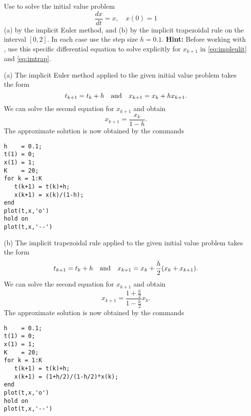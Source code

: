 \documentclass{ximera}
\begin{document}
\begin{exercise} \label{c15.1.7}
Use \Matlab to solve the initial value problem
\[
\frac{dx}{dt} = x,\quad x(0)=1
\]
(a) by the implicit Euler method, and (b) by the implicit trapezoidal 
rule on the interval $[0,2]$.  In each case use the step size $h=0.1$.
{\bf Hint:} Before working with \Matlabp, use this specific differential
equation to solve explicitly for $x_{k+1}$ in \eqref{eq:impleulit} and 
\eqref{eq:imtrap}.

\begin{solution}

(a) The implicit Euler method applied to the given initial
value problem takes the form
\[
t_{k+1} = t_k + h\quad\mbox{and}\quad x_{k+1} = x_k + h x_{k+1}.
\]
We can solve the second equation  for $x_{k+1}$ and obtain
\[
x_{k+1} = \frac{x_k}{1-h}.
\]
The approximate solution is now obtained by the \Matlab commands
\begin{verbatim}
h    = 0.1;
t(1) = 0;
x(1) = 1;
K    = 20;
for k = 1:K
   t(k+1) = t(k)+h;
   x(k+1) = x(k)/(1-h);
end
plot(t,x,'o')
hold on
plot(t,x,'--')
\end{verbatim}

(b) The implicit trapezoidal rule applied to the given initial
value problem takes the form
\[
t_{k+1} = t_k + h\quad\mbox{and}\quad x_{k+1} = x_k + \frac{h}{2}(x_k+x_{k+1}).
\]
We can solve the second equation for $x_{k+1}$ and obtain
\[
x_{k+1} = \frac{1+\frac{h}{2}}{1-\frac{h}{2}}x_k.
\]
The approximate solution is now obtained by the \Matlab commands
\begin{verbatim}
h    = 0.1;
t(1) = 0;
x(1) = 1;
K    = 20;
for k = 1:K
   t(k+1) = t(k)+h;
   x(k+1) = (1+h/2)/(1-h/2)*x(k);
end
plot(t,x,'o')
hold on
plot(t,x,'--')
\end{verbatim}

\end{solution}
\end{exercise}
\end{document}
